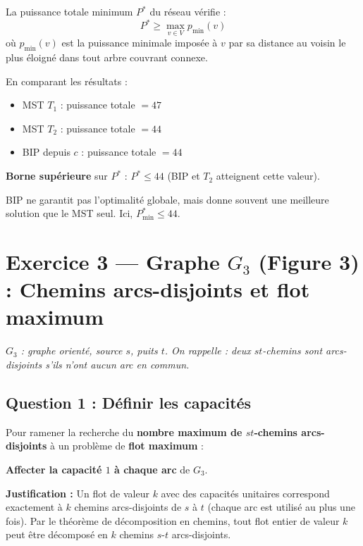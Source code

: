 \documentclass[12pt,a4paper]{article}
\begin{document}
\begin{solution}
La puissance totale minimum $P^*$ du réseau vérifie :
\[
P^* \geq \max_{v \in V} p_{\min}(v)
\]
où $p_{\min}(v)$ est la puissance minimale imposée à $v$ par sa distance au voisin le plus éloigné dans tout arbre couvrant connexe.

\medskip
En comparant les résultats :
\begin{itemize}
    \item MST $T_1$ : puissance totale $= 47$
    \item MST $T_2$ : puissance totale $= 44$
    \item BIP depuis $c$ : puissance totale $= 44$
\end{itemize}

\textbf{Borne supérieure} sur $P^*$ : $P^* \leq 44$ (BIP et $T_2$ atteignent cette valeur).

\begin{remarque}
BIP ne garantit pas l'optimalité globale, mais donne souvent une meilleure solution que le MST seul. Ici, $P^*_{\min} \le 44$.
\end{remarque}
\end{solution}

\newpage
\section{Exercice 3 --- Graphe $G_3$ (Figure 3) : Chemins arcs-disjoints et flot maximum}

\textit{$G_3$ : graphe orienté, source $s$, puits $t$. On rappelle : deux $st$-chemins sont arcs-disjoints s'ils n'ont aucun arc en commun.}

\subsection{Question 1 : Définir les capacités}

\begin{solution}
Pour ramener la recherche du \textbf{nombre maximum de $st$-chemins arcs-disjoints} à un problème de \textbf{flot maximum} :

\textbf{Affecter la capacité $1$ à chaque arc} de $G_3$.

\textbf{Justification :} Un flot de valeur $k$ avec des capacités unitaires correspond exactement à $k$ chemins arcs-disjoints de $s$ à $t$ (chaque arc est utilisé au plus une fois). Par le théorème de décomposition en chemins, tout flot entier de valeur $k$ peut être décomposé en $k$ chemins $s$-$t$ arcs-disjoints.
\end{solution}
\end{document}
